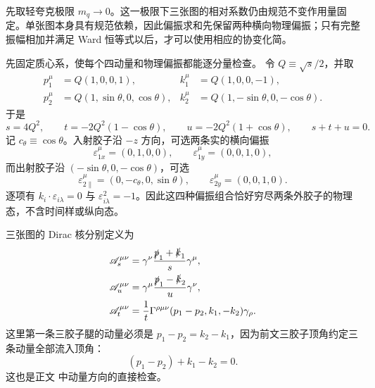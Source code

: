 \begin{derivation}
先取轻夸克极限 $m_q\to0$。这一极限下三张图的相对系数仍由规范不变作用量固定。单张图本身具有规范依赖，因此偏振求和先保留两种横向物理偏振；只有完整振幅相加并满足 Ward 恒等式以后，才可以使用相应的协变化简。

先固定质心系，使每个四动量和物理偏振都能逐分量检查。
令 $Q\equiv\sqrt{s}/2$，并取
\begin{align*}
 p_1^\mu&=Q(1,0,0,1),&
 k_1^\mu&=Q(1,0,0,-1),\\
 p_2^\mu&=Q(1,\sin\theta,0,\cos\theta),&
 k_2^\mu&=Q(1,-\sin\theta,0,-\cos\theta).
\end{align*}
于是
\begin{equation*}
 s=4Q^2,
 \qquad
 t=-2Q^2(1-\cos\theta),
 \qquad
 u=-2Q^2(1+\cos\theta),
 \qquad s+t+u=0.
\end{equation*}
记 $c_\theta\equiv\cos\theta$。入射胶子沿 $-z$ 方向，可选两条实的横向偏振
\begin{equation*}
 \varepsilon_{1x}^\mu=(0,1,0,0),
 \qquad
 \varepsilon_{1y}^\mu=(0,0,1,0),
\end{equation*}
而出射胶子沿 $(-\sin\theta,0,-\cos\theta)$，可选
\begin{equation*}
 \varepsilon_{2\parallel}^\mu=(0,-c_\theta,0,\sin\theta),
 \qquad
 \varepsilon_{2y}^\mu=(0,0,1,0).
\end{equation*}
逐项有 $k_i\cdot\varepsilon_{i\lambda}=0$ 与 $\varepsilon_{i\lambda}^2=-1$。因此这四种偏振组合恰好穷尽两条外胶子的物理态，不含时间样或纵向态。

三张图的 Dirac 核分别定义为
\begin{align*}
 \mathscr A_s^{\mu\nu}
 &=\gamma^\nu\frac{\slashed p_1+\slashed k_1}{s}\gamma^\mu,\\
 \mathscr A_u^{\mu\nu}
 &=\gamma^\mu\frac{\slashed p_1-\slashed k_2}{u}\gamma^\nu,\\
 \mathscr A_t^{\mu\nu}
 &=\frac1t\Gamma^{\rho\mu\nu}(p_1-p_2,k_1,-k_2)\gamma_\rho.
\end{align*}
这里第一条三胶子腿的动量必须是 $p_1-p_2=k_2-k_1$，因为前文三胶子顶角约定三条动量全部流入顶角：
\begin{equation*}
 (p_1-p_2)+k_1-k_2=0.
\end{equation*}
这也是正文 中动量方向的直接检查。


\end{derivation}
